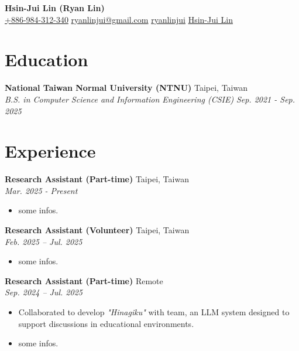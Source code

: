 \documentclass[a4paper,11pt]{article}
\newcommand{\makeheader}[5]{
    \begin{center}
        {\fontsize{18}{30}\selectfont\mdseries\ttfamily\bfseries\color{namecolor} #1}\\[0.25em]
        {\footnotesize
            \href{tel:#2}{\color{textcolor}\raisebox{-1pt}{} #2} \quad
            \href{mailto:#3}{\color{textcolor}\raisebox{-1pt}{} #3} \quad
            \href{https://github.com/#4}{\color{textcolor}\raisebox{-2pt}{} #4} \quad
            \href{https://linkedin.com/in/#4}{\color{textcolor}\raisebox{-1.5pt}{} #5}
        }
    \end{center}
    \vspace{-2em}
}
\begin{document}
\makeheader{Hsin-Jui Lin (Ryan Lin)}{+886-984-312-340}{ryanlinjui@gmail.com}{ryanlinjui}{Hsin-Jui Lin}

\section{Education}
\noindent \textbf{National Taiwan Normal University (NTNU)} \hfill Taipei, Taiwan\\
\textit{B.S. in Computer Science and Information Engineering (CSIE)} \hfill \textit{Sep. 2021 - Sep. 2025}

\section{Experience}
\noindent \textbf{Research Assistant (Part-time)} \hfill Taipei, Taiwan\\
 \hfill \textit{Mar. 2025 - Present}
\begin{itemize}
    \item some infos.
\end{itemize}
\vspace{0.25em}

\noindent \textbf{Research Assistant (Volunteer)} \hfill Taipei, Taiwan\\
 \hfill \textit{Feb. 2025 -- Jul. 2025}
\begin{itemize}
    \item some infos.
\end{itemize}
\vspace{0.25em}

\noindent \textbf{Research Assistant (Part-time)} \hfill Remote\\
 \hfill \textit{Sep. 2024 -- Jul. 2025}
\begin{itemize}
    \item Collaborated to develop  \textit{"Hinagiku"} \href{https://github.com/hinagiku-dev/Hinagiku}{\color{textcolor}\raisebox{0pt}{}} with team, an LLM system designed to support discussions in educational environments.
    \item some infos.
\end{itemize}
\vspace{0.25em}
\end{document}
